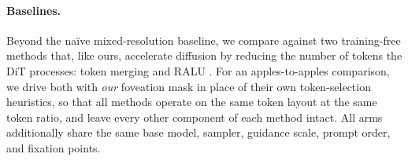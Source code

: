%

\paragraph{Baselines.}
Beyond the na\"ive mixed-resolution baseline, we compare against two training-free methods
that, like ours, accelerate diffusion by reducing the number of tokens the DiT processes:
token merging \citep{bolya2023tomesd,wu2025tome} and RALU \citep{ralu2026}. For an
apples-to-apples comparison, we drive both with \emph{our} foveation mask in place of
their own token-selection heuristics, so that all methods operate on the same token layout
at the same token ratio, and leave every other component of each method intact. All arms
additionally share the same base model, sampler, guidance scale, prompt order, and
fixation points.
